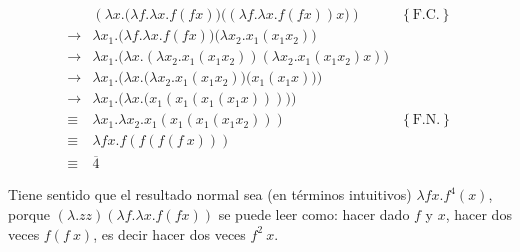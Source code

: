 \documentclass[article, 12pt]{article}
\begin{document}
\begin{align*}
&\left( \lambda x. \Big( \lambda f. \lambda x. f(fx) \Big)\Big( \left(
\lambda f. \lambda x. f(fx) \right)x  \Big) \right) &\left\{ \text{F.C.}
\right\} \\ 
\to & \lambda x_1. \Big( \lambda f. \lambda x. f(fx) \Big)\Big( \lambda x_2. x_1
(x_1 x_2)\Big) \\
  \to &\lambda x_1. \Big( \lambda x.(\lambda x_2. x_1(x_1 x_2)) \left( \lambda
  x_2. x_1 (x_1 x_2) x \right)  \Big)\\ 
      \to & \lambda x_1 . \Big( \lambda x. \big( \lambda x_2. x_1(x_1 x_2) \big)
      \big( x_1(x_1 x) \big)\Big) \\ 
\to & \lambda x_1. \Big( \lambda x. \big(  x_1 (x_1(x_1(x_1 x))) \big) \Big) \\ 
\equiv ~&\lambda x_1.\lambda x_2. x_1(x_1(x_1(x_1 x_2))) &\left\{ \text{F.N.}
\right\}  \\ 
  \equiv ~&\lambda f x. f(f(f( f ~ x))) \\ 
  \equiv~& \overline{4}
\end{align*}

Tiene sentido que el resultado normal sea (en términos intuitivos) $\lambda fx.f^4(x)$,
porque $(\lambda .zz)(\lambda f. \lambda x. f(fx))$ se puede leer como: hacer
dado $f$ y $x$, hacer dos veces $f(f ~ x)$, es decir hacer dos veces $f^2 ~ x$.
\end{document}
